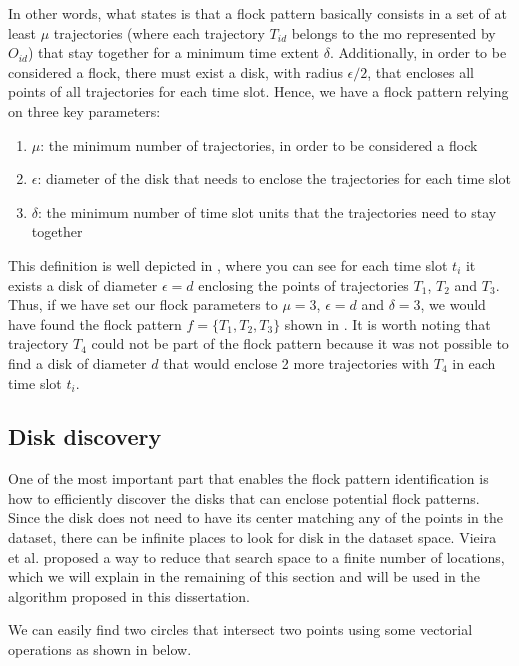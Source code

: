 In other words, what  states is that a flock pattern basically consists in a set of at least $\mu$
trajectories (where each trajectory $T_{id}$ belongs to the \ac{mo} represented by $O_{id}$) that stay together for a
minimum time extent $\delta$.  Additionally, in order to be considered a flock, there must exist a disk, with radius
$\epsilon/2$, that encloses all points of all trajectories for each time slot. Hence, we have a flock pattern relying on
three key parameters:

\begin{enumerate}
    \item $\mu$: the minimum number of trajectories, in order to be considered a flock
    \item $\epsilon$: diameter of the disk that needs to enclose the trajectories for each time slot
    \item $\delta$: the minimum number of time slot units that the trajectories need to stay together
\end{enumerate}

This definition is well depicted in , where you can see for each time slot $t_i$ it exists a disk of
diameter $\epsilon = d$ enclosing the points of trajectories $T_1$, $T_2$ and $T_3$. Thus, if we have set our flock
parameters to $\mu = 3$, $\epsilon = d$ and $\delta = 3$, we would have found the flock pattern $f = \{T_1, T_2, T_3\}$
shown in . It is worth noting that trajectory $T_4$ could not be part of the flock pattern because it
was not possible to find a disk of diameter $d$ that would enclose 2 more trajectories with $T_4$ in each time slot
$t_i$.

\subsection{Disk discovery}
\label{subsec:disk_discovery}

One of the most important part that enables the flock pattern identification is how to efficiently discover the disks
that can enclose potential flock patterns. Since the disk does not need to have its center matching any of the points in
the dataset, there can be infinite places to look for disk in the dataset space. Vieira et al. \citep{vieira} proposed a
way to reduce that search space to a finite number of locations, which we will explain in the remaining of this section
and will be used in the algorithm proposed in this dissertation.

We can easily find two circles that intersect two points using some vectorial operations as shown in
 below.

